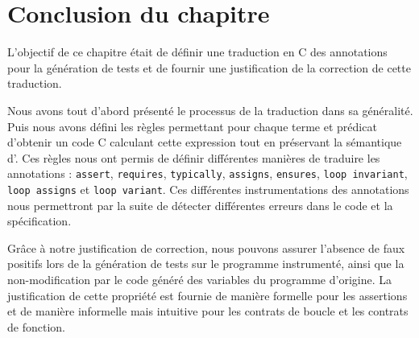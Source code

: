 \section*{Conclusion du chapitre}

L'objectif de ce chapitre était de définir une traduction en C des annotations
\eacsl pour la génération de tests et de fournir une justification de la
correction de cette traduction.

Nous avons tout d'abord présenté le processus de la traduction dans sa
généralité.
Puis nous avons défini les règles permettant pour chaque terme et prédicat
\eacsl d'obtenir un code C calculant cette expression tout en préservant la
sémantique d'\eacsl.
Ces règles nous ont permis de définir différentes manières de traduire les
annotations \eacsl : \lstinline'assert', \lstinline'requires',
\lstinline'typically', \lstinline'assigns', \lstinline'ensures',
\lstinline'loop invariant', \lstinline'loop assigns' et
\lstinline'loop variant'.
Ces différentes instrumentations des annotations nous permettront par la suite
de détecter différentes erreurs dans le code et la spécification.

Grâce à notre justification de correction, nous pouvons assurer l'absence de
faux positifs lors de la génération de tests sur le programme instrumenté, ainsi
que la non-modification par le code généré des variables du programme d'origine.
La justification de cette propriété est fournie de manière formelle pour les
assertions et de manière informelle mais intuitive pour les contrats de boucle
et les contrats de fonction.

